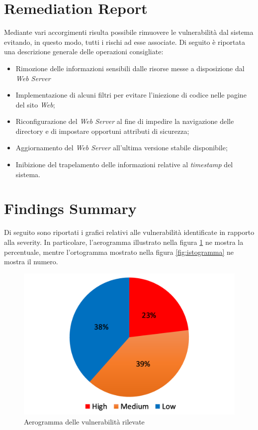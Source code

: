 \documentclass[a4paper,11pt,oneside,top=3cm,bottom=3cm,left=3.5cm,right=3.5cm,openright,reqno,table]{book}
\begin{document}
\section{Remediation Report}
Mediante vari accorgimenti risulta possibile rimuovere le vulnerabilità dal sistema evitando, in questo modo, tutti i rischi ad esse associate. Di seguito è riportata una descrizione generale delle operazioni consigliate:
\begin{itemize}
    \item Rimozione delle informazioni sensibili dalle risorse messe a disposizione dal \emph{Web Server}
    \item Implementazione di alcuni filtri per evitare l'iniezione di codice nelle pagine del sito \emph{Web};
    \item Riconfigurazione del \emph{Web Server} al fine di impedire la navigazione delle directory e di impostare opportuni attributi di sicurezza;
    \item Aggiornamento del \emph{Web Server} all'ultima versione stabile disponibile;
    \item Inibizione del trapelamento delle informazioni relative al \emph{timestamp} del sistema.
\end{itemize}
\section{Findings Summary}
Di seguito sono riportati i grafici relativi alle vulnerabilità identificate in rapporto alla severity. In particolare, l'aerogramma illustrato nella figura \ref{fig:aerogramma} ne mostra la percentuale, mentre l'ortogramma mostrato nella figura \ref{fig:istogramma} ne mostra il numero.
\begin{figure}[h]
    \centering
    \includegraphics[scale=0.3]{capitoli/images/aerogramma.png}
    \caption{Aerogramma delle vulnerabilità rilevate}
    \label{fig:aerogramma}
\end{figure}
\end{document}
